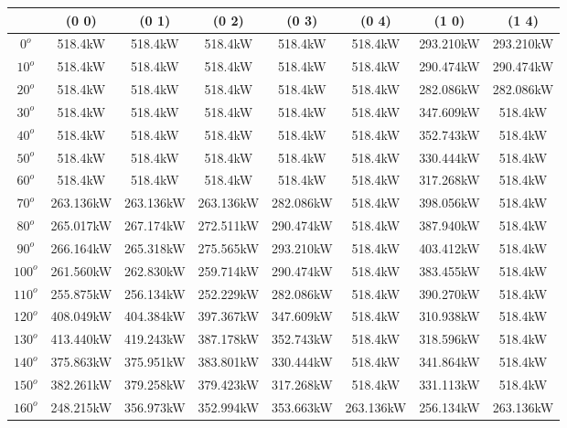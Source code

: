         \singlespacing
        \begin{table}[H]
        	\centering
        	\begin{tabular}{|c|c|c|c|c|c|c|c|} \hline
        			& (0 0)		& (0 1)		& (0 2)		& (0 3)		& (0 4)		& (1 0)		& (1 4)		\\ \hline
		$0^o$	& 518.4kW	& 518.4kW	& 518.4kW	& 518.4kW	& 518.4kW	& 293.210kW	& 293.210kW	\\ \hline
		$10^o$	& 518.4kW	& 518.4kW	& 518.4kW	& 518.4kW	& 518.4kW	& 290.474kW	& 290.474kW	\\ \hline
		$20^o$	& 518.4kW	& 518.4kW	& 518.4kW	& 518.4kW	& 518.4kW	& 282.086kW	& 282.086kW	\\ \hline
		$30^o$	& 518.4kW	& 518.4kW	& 518.4kW	& 518.4kW	& 518.4kW	& 347.609kW	& 518.4kW	\\ \hline
		$40^o$	& 518.4kW	& 518.4kW	& 518.4kW	& 518.4kW	& 518.4kW	& 352.743kW	& 518.4kW	\\ \hline
		$50^o$	& 518.4kW	& 518.4kW	& 518.4kW	& 518.4kW	& 518.4kW	& 330.444kW	& 518.4kW	\\ \hline
		$60^o$	& 518.4kW	& 518.4kW	& 518.4kW	& 518.4kW	& 518.4kW	& 317.268kW	& 518.4kW	\\ \hline
		$70^o$	& 263.136kW	& 263.136kW	& 263.136kW	& 282.086kW	& 518.4kW	& 398.056kW	& 518.4kW	\\ \hline
		$80^o$	& 265.017kW	& 267.174kW	& 272.511kW	& 290.474kW	& 518.4kW	& 387.940kW	& 518.4kW	\\ \hline
		$90^o$	& 266.164kW	& 265.318kW	& 275.565kW	& 293.210kW	& 518.4kW	& 403.412kW	& 518.4kW	\\ \hline
		$100^o$	& 261.560kW	& 262.830kW	& 259.714kW	& 290.474kW	& 518.4kW	& 383.455kW	& 518.4kW	\\ \hline
		$110^o$	& 255.875kW	& 256.134kW	& 252.229kW	& 282.086kW	& 518.4kW	& 390.270kW	& 518.4kW	\\ \hline
		$120^o$	& 408.049kW	& 404.384kW	& 397.367kW	& 347.609kW	& 518.4kW	& 310.938kW	& 518.4kW	\\ \hline
		$130^o$	& 413.440kW	& 419.243kW	& 387.178kW	& 352.743kW	& 518.4kW	& 318.596kW	& 518.4kW	\\ \hline
		$140^o$	& 375.863kW	& 375.951kW	& 383.801kW	& 330.444kW	& 518.4kW	& 341.864kW	& 518.4kW	\\ \hline
		$150^o$	& 382.261kW	& 379.258kW	& 379.423kW	& 317.268kW	& 518.4kW	& 331.113kW	& 518.4kW	\\ \hline
		$160^o$	& 248.215kW	& 356.973kW	& 352.994kW	& 353.663kW	& 263.136kW	& 256.134kW	& 263.136kW	\\ \hline

\end{tabular}
\end{table}
